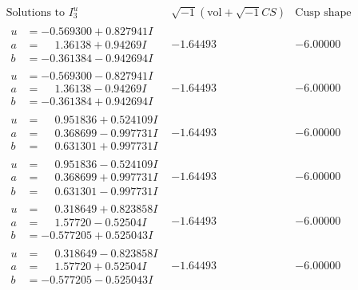 \documentclass[1p]{elsarticle_modified}
\theoremstyle{definition}
\newcommand{\I}{\sqrt{-1}}
\begin{document}
$$\begin{array}{c|c|c}  
\text{Solutions to }I^u_{3}& \I (\text{vol} + \sqrt{-1}CS) & \text{Cusp shape}\\
 \hline 
\begin{aligned}
u &= -0.569300 + 0.827941 I \\
a &= \phantom{-}1.36138 + 0.94269 I \\
b &= -0.361384 - 0.942694 I\end{aligned}
 & -1.64493\phantom{ +0.000000I} & -6.00000\phantom{ +0.000000I} \\ \hline\begin{aligned}
u &= -0.569300 - 0.827941 I \\
a &= \phantom{-}1.36138 - 0.94269 I \\
b &= -0.361384 + 0.942694 I\end{aligned}
 & -1.64493\phantom{ +0.000000I} & -6.00000\phantom{ +0.000000I} \\ \hline\begin{aligned}
u &= \phantom{-}0.951836 + 0.524109 I \\
a &= \phantom{-}0.368699 - 0.997731 I \\
b &= \phantom{-}0.631301 + 0.997731 I\end{aligned}
 & -1.64493\phantom{ +0.000000I} & -6.00000\phantom{ +0.000000I} \\ \hline\begin{aligned}
u &= \phantom{-}0.951836 - 0.524109 I \\
a &= \phantom{-}0.368699 + 0.997731 I \\
b &= \phantom{-}0.631301 - 0.997731 I\end{aligned}
 & -1.64493\phantom{ +0.000000I} & -6.00000\phantom{ +0.000000I} \\ \hline\begin{aligned}
u &= \phantom{-}0.318649 + 0.823858 I \\
a &= \phantom{-}1.57720 - 0.52504 I \\
b &= -0.577205 + 0.525043 I\end{aligned}
 & -1.64493\phantom{ +0.000000I} & -6.00000\phantom{ +0.000000I} \\ \hline\begin{aligned}
u &= \phantom{-}0.318649 - 0.823858 I \\
a &= \phantom{-}1.57720 + 0.52504 I \\
b &= -0.577205 - 0.525043 I\end{aligned}
 & -1.64493\phantom{ +0.000000I} & -6.00000\phantom{ +0.000000I} \\ \hline\begin{aligned}

\end{aligned}
\end{array}$$
\end{document}
